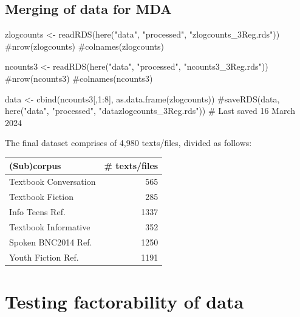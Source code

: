 \documentclass[
  letterpaper,
  DIV=11,
  numbers=noendperiod]{scrreprt}
\newenvironment{Shaded}{\begin{snugshade}}{\end{snugshade}}
\newcommand{\CommentTok}[1]{\textcolor[rgb]{0.37,0.37,0.37}{#1}}
\newcommand{\DecValTok}[1]{\textcolor[rgb]{0.68,0.00,0.00}{#1}}
\newcommand{\FunctionTok}[1]{\textcolor[rgb]{0.28,0.35,0.67}{#1}}
\newcommand{\NormalTok}[1]{\textcolor[rgb]{0.00,0.23,0.31}{#1}}
\newcommand{\OtherTok}[1]{\textcolor[rgb]{0.00,0.23,0.31}{#1}}
\newcommand{\SpecialCharTok}[1]{\textcolor[rgb]{0.37,0.37,0.37}{#1}}
\newcommand{\StringTok}[1]{\textcolor[rgb]{0.13,0.47,0.30}{#1}}
\begin{document}
\subsection{Merging of data for MDA}\label{merging-of-data-for-mda}

\begin{Shaded}
\begin{Highlighting}[]
\NormalTok{zlogcounts }\OtherTok{\textless{}{-}} \FunctionTok{readRDS}\NormalTok{(}\FunctionTok{here}\NormalTok{(}\StringTok{"data"}\NormalTok{, }\StringTok{"processed"}\NormalTok{, }\StringTok{"zlogcounts\_3Reg.rds"}\NormalTok{)) }
\CommentTok{\#nrow(zlogcounts)}
\CommentTok{\#colnames(zlogcounts)}

\NormalTok{ncounts3 }\OtherTok{\textless{}{-}} \FunctionTok{readRDS}\NormalTok{(}\FunctionTok{here}\NormalTok{(}\StringTok{"data"}\NormalTok{, }\StringTok{"processed"}\NormalTok{, }\StringTok{"ncounts3\_3Reg.rds"}\NormalTok{))}
\CommentTok{\#nrow(ncounts3)}
\CommentTok{\#colnames(ncounts3)}

\NormalTok{data }\OtherTok{\textless{}{-}} \FunctionTok{cbind}\NormalTok{(ncounts3[,}\DecValTok{1}\SpecialCharTok{:}\DecValTok{8}\NormalTok{], }\FunctionTok{as.data.frame}\NormalTok{(zlogcounts))}
\CommentTok{\#saveRDS(data, here("data", "processed", "datazlogcounts\_3Reg.rds")) \# Last saved 16 March 2024}
\end{Highlighting}
\end{Shaded}

The final dataset comprises of 4,980 texts/files, divided as follows:

\begin{longtable}[]{@{}lr@{}}
\toprule\noalign{}
(Sub)corpus & \# texts/files \\
\midrule\noalign{}
\endhead
\bottomrule\noalign{}
\endlastfoot
Textbook Conversation & 565 \\
Textbook Fiction & 285 \\
Info Teens Ref. & 1337 \\
Textbook Informative & 352 \\
Spoken BNC2014 Ref. & 1250 \\
Youth Fiction Ref. & 1191 \\
\end{longtable}

\section{Testing factorability of
data}\label{testing-factorability-of-data}
\end{document}
